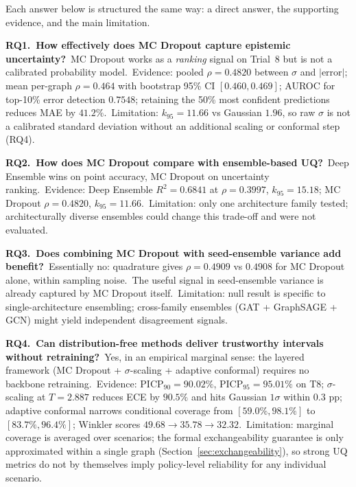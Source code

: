 Each answer below is structured the same way: a direct answer, the supporting evidence, and the main limitation.

\textbf{RQ1.\ How effectively does MC Dropout capture epistemic uncertainty?}\ MC Dropout works as a \emph{ranking} signal on Trial~8 but is not a calibrated probability model.\ Evidence: pooled $\rho = 0.4820$ between $\sigma$ and $|\text{error}|$; mean per-graph $\rho = 0.464$ with bootstrap 95\% CI $[0.460, 0.469]$; AUROC for top-10\% error detection $0.7548$; retaining the 50\% most confident predictions reduces MAE by $41.2\%$.\ Limitation: $k_{95} = 11.66$ vs Gaussian $1.96$, so raw $\sigma$ is not a calibrated standard deviation without an additional scaling or conformal step (RQ4).

\textbf{RQ2.\ How does MC Dropout compare with ensemble-based UQ?}\ Deep Ensemble wins on point accuracy, MC Dropout on uncertainty ranking.\ Evidence: Deep Ensemble $R^2 = 0.6841$ at $\rho = 0.3997$, $k_{95} = 15.18$; MC Dropout $\rho = 0.4820$, $k_{95} = 11.66$.\ Limitation: only one architecture family tested; architecturally diverse ensembles could change this trade-off and were not evaluated.

\textbf{RQ3.\ Does combining MC Dropout with seed-ensemble variance add benefit?}\ Essentially no: quadrature gives $\rho = 0.4909$ vs $0.4908$ for MC Dropout alone, within sampling noise.\ The useful signal in seed-ensemble variance is already captured by MC Dropout itself.\ Limitation: null result is specific to single-architecture ensembling; cross-family ensembles (GAT + GraphSAGE + GCN) might yield independent disagreement signals.

\textbf{RQ4.\ Can distribution-free methods deliver trustworthy intervals without retraining?}\ Yes, in an empirical marginal sense: the layered framework (MC Dropout + $\sigma$-scaling + adaptive conformal) requires no backbone retraining.\ Evidence: $\mathrm{PICP}_{90} = 90.02\%$, $\mathrm{PICP}_{95} = 95.01\%$ on T8; $\sigma$-scaling at $T = 2.887$ reduces ECE by $90.5\%$ and hits Gaussian $1\sigma$ within $0.3$ pp; adaptive conformal narrows conditional coverage from $[59.0\%, 98.1\%]$ to $[83.7\%, 96.4\%]$; Winkler scores $49.68 \to 35.78 \to 32.32$.\ Limitation: marginal coverage is averaged over scenarios; the formal exchangeability guarantee is only approximated within a single graph (Section~\ref{sec:exchangeability}), so strong UQ metrics do not by themselves imply policy-level reliability for any individual scenario.

